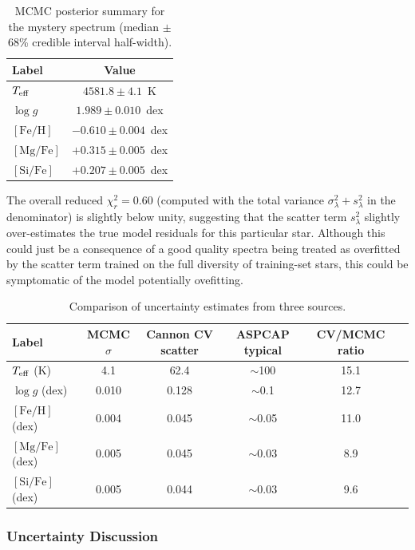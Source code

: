 \documentclass[10pt,preprint2]{aastex}
\begin{document}
\begin{table}[H]
\centering
\caption{MCMC posterior summary for the mystery spectrum (median $\pm$ 68\% credible interval half-width).\label{tab:mcmc_results}}
\begin{tabular}{lc}
\toprule
Label & Value \\
\midrule
$T_{\rm eff}$        & $4581.8 \pm 4.1$~K \\
$\log g$              & $1.989 \pm 0.010$~dex \\
$[\mathrm{Fe/H}]$    & $-0.610 \pm 0.004$~dex \\
$[\mathrm{Mg/Fe}]$   & $+0.315 \pm 0.005$~dex \\
$[\mathrm{Si/Fe}]$   & $+0.207 \pm 0.005$~dex \\
\bottomrule
\end{tabular}
\end{table}

The overall reduced $\chi^2_r = 0.60$ (computed with the total variance $\sigma_\lambda^2 + s_\lambda^2$ in the denominator) is slightly below unity, suggesting that the scatter term $s_\lambda^2$ slightly over-estimates the true model residuals for this particular star. Although this could just be a consequence of a good quality spectra being treated as overfitted by the scatter term trained on the full diversity of training-set stars, this could be symptomatic of the model potentially ovefitting.

\begin{table}[b!]
\centering
\caption{Comparison of uncertainty estimates from three sources.\label{tab:uncertainty_comparison}}
\begin{tabular}{lccccc}
\hline\hline
Label & MCMC $\sigma$ & Cannon CV scatter & ASPCAP typical & CV/MCMC ratio \\
\hline
$T_{\rm eff}$ (K)        & 4.1  & 62.4  & $\sim$100 & 15.1 \\
$\log g$ (dex)            & 0.010 & 0.128 & $\sim$0.1 & 12.7 \\
$[\mathrm{Fe/H}]$ (dex)  & 0.004 & 0.045 & $\sim$0.05 & 11.0 \\
$[\mathrm{Mg/Fe}]$ (dex) & 0.005 & 0.045 & $\sim$0.03 & 8.9  \\
$[\mathrm{Si/Fe}]$ (dex) & 0.005 & 0.044 & $\sim$0.03 & 9.6  \\
\hline\hline
\end{tabular}
\end{table}

\subsubsection{Uncertainty Discussion}
\end{document}
